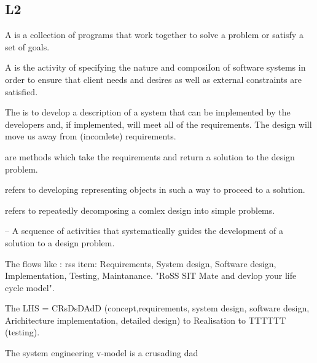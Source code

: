 \subsection{L2}
\begin{compactitem}
\item A 
is a collection of programs that
work together to solve a problem or satisfy a set of
goals. 

\item A  is the activity of specifying the
nature and composiIon of software systems in
order to ensure that client needs and desires as
well as external constraints are satisfied.

\item The
is to develop a description of a
system that can be implemented by the developers
and, if implemented, will meet all of the requirements. The design will move us away from (incomlete) requirements. 

\item {} are methods which take the requirements and return a solution to the design problem.

\item {} refers to developing representing objects in such a way to proceed to a solution.

\item {} refers to repeatedly decomposing a comlex design into simple problems.

\item {} 
– A sequence of activities that systematically guides the development of a solution to a design problem.

\item The  flows like
: rss item: Requirements, System design, Software design, Implementation, Testing, Maintanance. "RoSS SIT Mate and devlop your life cycle model". 

\item The  LHS = CRsDsDAdD (concept,requirements, system design, software design, Arichitecture implementation, detailed design) to Realisation to TTTTTT (testing). \begin{R} The system engineering v-model is a crusading dad \end{R}


\end{compactitem}
